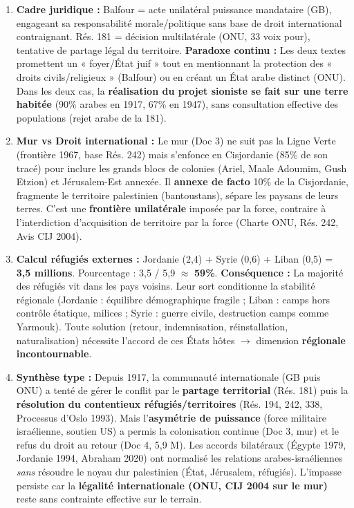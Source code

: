 \documentclass[11pt]{article}
\begin{document}
\begin{corrige}
\begin{enumerate}
    \item \textbf{Cadre juridique :} Balfour = acte unilatéral puissance mandataire (GB), engageant sa responsabilité morale/politique sans base de droit international contraignant. Rés. 181 = décision multilatérale (ONU, 33 voix pour), tentative de partage légal du territoire. \textbf{Paradoxe continu :} Les deux textes promettent un « foyer/État juif » tout en mentionnant la protection des « droits civils/religieux » (Balfour) ou en créant un État arabe distinct (ONU). Dans les deux cas, la \textbf{réalisation du projet sioniste se fait sur une terre habitée} (90\% arabes en 1917, 67\% en 1947), sans consultation effective des populations (rejet arabe de la 181).
    \item \textbf{Mur vs Droit international :} Le mur (Doc 3) ne suit pas la Ligne Verte (frontière 1967, base Rés. 242) mais s'enfonce en Cisjordanie (85\% de son tracé) pour inclure les grands blocs de colonies (Ariel, Maale Adoumim, Gush Etzion) et Jérusalem-Est annexée. Il \textbf{annexe de facto} 10\% de la Cisjordanie, fragmente le territoire palestinien (bantoustans), sépare les paysans de leurs terres. C'est une \textbf{frontière unilatérale} imposée par la force, contraire à l'interdiction d'acquisition de territoire par la force (Charte ONU, Rés. 242, Avis CIJ 2004).
    \item \textbf{Calcul réfugiés externes :} Jordanie (2,4) + Syrie (0,6) + Liban (0,5) = \textbf{3,5 millions}. Pourcentage : 3,5 / 5,9 $\approx$ \textbf{59\%}. \textbf{Conséquence :} La majorité des réfugiés vit dans les pays voisins. Leur sort conditionne la stabilité régionale (Jordanie : équilibre démographique fragile ; Liban : camps hors contrôle étatique, milices ; Syrie : guerre civile, destruction camps comme Yarmouk). Toute solution (retour, indemnisation, réinstallation, naturalisation) nécessite l'accord de ces États hôtes $\rightarrow$ dimension \textbf{régionale incontournable}.
    \item \textbf{Synthèse type :} Depuis 1917, la communauté internationale (GB puis ONU) a tenté de gérer le conflit par le \textbf{partage territorial} (Rés. 181) puis la \textbf{résolution du contentieux réfugiés/territoires} (Rés. 194, 242, 338, Processus d'Oslo 1993). Mais l'\textbf{asymétrie de puissance} (force militaire israélienne, soutien US) a permis la colonisation continue (Doc 3, mur) et le refus du droit au retour (Doc 4, 5,9 M). Les accords bilatéraux (Égypte 1979, Jordanie 1994, Abraham 2020) ont normalisé les relations arabes-israéliennes \textit{sans} résoudre le noyau dur palestinien (État, Jérusalem, réfugiés). L'impasse persiste car la \textbf{légalité internationale (ONU, CIJ 2004 sur le mur)} reste sans contrainte effective sur le terrain.
\end{enumerate}
\end{corrige}
\end{document}
